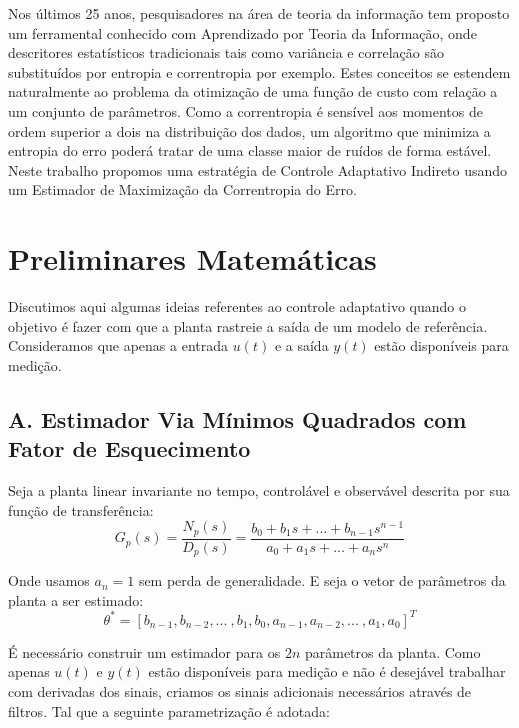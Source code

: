\documentclass[conference,harvard,brazil,english]{sbatex}
\begin{document}
Nos últimos 25 anos, pesquisadores na área de teoria da informação tem proposto um ferramental conhecido com Aprendizado por Teoria da Informação, onde descritores estatísticos tradicionais tais como variância e correlação são substituídos por entropia e correntropia por exemplo. Estes conceitos se estendem naturalmente ao problema da otimização de uma função de custo com relação a um conjunto de parâmetros. Como a correntropia é sensível aos momentos de ordem superior a dois na distribuição dos dados, um algoritmo que minimiza a entropia do erro poderá tratar de uma classe maior de ruídos de forma estável. Neste trabalho propomos uma estratégia de Controle Adaptativo Indireto usando um Estimador de Maximização da Correntropia do Erro.


\section{Preliminares Matemáticas}

Discutimos aqui algumas ideias referentes ao controle adaptativo quando o objetivo é fazer com que a planta rastreie a saída de um modelo de referência. Consideramos que apenas a entrada $u(t)$ e a saída $y(t)$ estão disponíveis para medição.

\subsection*{A. Estimador Via Mínimos Quadrados com Fator de Esquecimento}

Seja a planta linear invariante no tempo, controlável e observável descrita por sua função de transferência:
\begin{equation}
G_p(s) = \frac{N_p(s)}{D_p(s)} = \frac{b_0 + b_1 s + ... + b_{n-1} s^{n-1}}{a_0 + a_1 s+ ... + a_n s^n}
\end{equation}

Onde usamos $a_n = 1$ sem perda de generalidade. E seja o vetor de parâmetros da planta a ser estimado:
\begin{equation*}
\theta^* = [b_{n-1}, b_{n-2}, ...~ , b_1, b_0, a_{n-1}, a_{n-2}, ...~ , a_1, a_0]^T
\end{equation*}

É necessário construir um estimador para os $2n$ parâmetros da planta. Como apenas $u(t)$ e $y(t)$ estão disponíveis para medição e não é desejável trabalhar com derivadas dos sinais, criamos os sinais adicionais necessários através de filtros. Tal que a seguinte parametrização é adotada:
\end{document}
